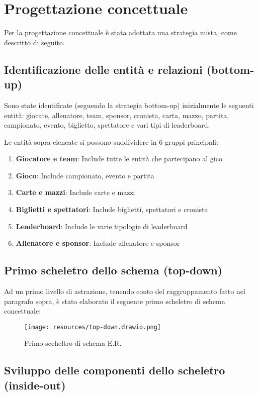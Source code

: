 \documentclass{article}
\begin{document}
\section{Progettazione concettuale}

Per la progettazione concettuale è stata adottata una strategia mista, come descritto di seguito.

\subsection{Identificazione delle entità e relazioni (bottom-up)}

Sono state identificate (seguendo la strategia bottom-up) inizialmente le seguenti entità: giocate, allenatore, team, sponsor, cronista, carta, mazzo, partita, campionato, evento, biglietto, spettatore e vari tipi di leaderboard.

Le entità sopra elencate si possono suddividere in 6 gruppi principali:
\begin{enumerate}
    \item \textbf{Giocatore e team}: Include tutte le entità che partecipano al gico
    \item \textbf{Gioco}: Include campionato, evento e partita
    \item \textbf{Carte e mazzi}: Include carte e mazzi
    \item \textbf{Biglietti e spettatori}: Include biglietti, spettatori e cronista
    \item \textbf{Leaderboard}: Include le varie tipologie di leaderboard
    \item \textbf{Allenatore e sponsor}: Include allenatore e sponsor
\end{enumerate}

\subsection{Primo scheletro dello schema (top-down)}

Ad un primo livello di astrazione, tenendo conto del raggruppamento fatto nel paragrafo sopra, è stato elaborato il seguente primo scheletro di schema concettuale:

\begin{figure}
    \centering
    \texttt{[image: resources/top-down.drawio.png]}
    \caption{Primo sceheltro di schema E.R.}
\end{figure}

\subsection{Sviluppo delle componenti dello scheletro (inside-out)}
\end{document}
